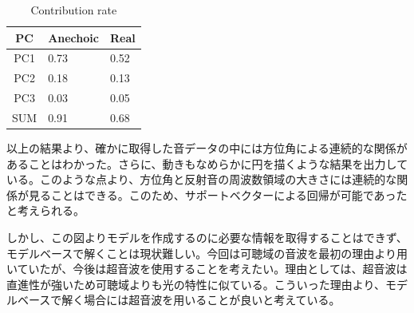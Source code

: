 \begin{table}[t]
    \centering
    \caption{Contribution rate}
    \vspace{1zh}
    \begin{tabular}{|c||p{4em}|p{4em}|} \hline
        PC & Anechoic & Real \\ \hline\hline
        PC1 & 0.73 & 0.52 \\ \hline
        PC2 & 0.18 & 0.13 \\ \hline
        PC3 & 0.03 & 0.05 \\ \hline
        SUM & 0.91 & 0.68 \\ \hline
    \end{tabular}
    \label{tab:pes_contri}
\end{table}

以上の結果より、確かに取得した音データの中には方位角による連続的な関係があることはわかった。さらに、動きもなめらかに円を描くような結果を出力している。このような点より、方位角と反射音の周波数領域の大きさには連続的な関係が見ることはできる。このため、サポートベクターによる回帰が可能であったと考えられる。

しかし、この図よりモデルを作成するのに必要な情報を取得することはできず、モデルベースで解くことは現状難しい。今回は可聴域の音波を最初の理由より用いていたが、今後は超音波を使用することを考えたい。理由としては、超音波は直進性が強いため可聴域よりも光の特性に似ている。こういった理由より、モデルベースで解く場合には超音波を用いることが良いと考えている。

\clearpage
\newpage
